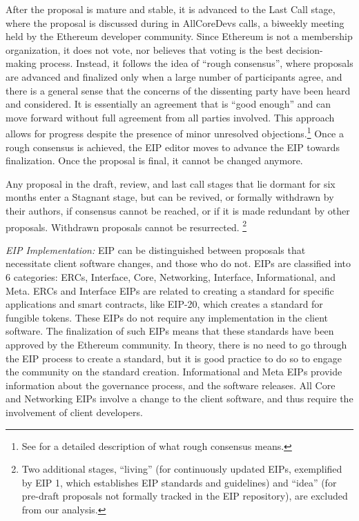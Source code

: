 \documentclass[No]{AEA}
\begin{document}
After the proposal is mature and stable, it is advanced to the Last Call stage, where the proposal is discussed during in AllCoreDevs calls, a biweekly meeting held by the Ethereum developer community. Since Ethereum is not a membership organization, it does not vote, nor believes that voting is the best decision-making process. Instead, it follows the idea of ``rough consensus'', where proposals are advanced and finalized only when a large number of participants agree, and there is a general sense that the concerns of the dissenting party have been heard and considered. It is essentially an agreement that is ``good enough'' and can move forward without full agreement from all parties involved. This approach allows for progress despite the presence of minor unresolved objections.\footnote{See \cite{Resnick2014} for a detailed description of what rough consensus means.} Once a rough consensus is achieved, the EIP editor moves to advance the EIP towards finalization. Once the proposal is final, it cannot be changed anymore.

Any proposal in the draft, review, and last call stages that lie dormant for six months enter a Stagnant stage, but can be revived, or formally withdrawn by their authors, if consensus cannot be reached, or if it is made redundant by other proposals. Withdrawn proposals cannot be resurrected. \footnote{Two additional stages, ``living'' (for continuously updated EIPs, exemplified by EIP 1, which establishes EIP standards and guidelines) and ``idea'' (for pre-draft proposals not formally tracked in the EIP repository), are excluded from our analysis.} 

\textit{EIP Implementation:}  EIP can be distinguished between proposals that necessitate client software changes, and those who do not. EIPs are classified into 6 categories: ERCs, Interface, Core, Networking, Interface, Informational, and Meta. ERCs and Interface EIPs are related to creating a standard for specific applications and smart contracts, like EIP-20, which creates a standard for fungible tokens. These EIPs do not require any implementation in the client software. The finalization of such EIPs means that these standards have been approved by the Ethereum community. In theory, there is no need to go through the EIP process to create a standard, but it is good practice to do so to engage the community on the standard creation. Informational and Meta EIPs provide information about the governance process, and the software releases. All Core and Networking EIPs involve a change to the client software, and thus require the involvement of client developers. 
\end{document}
